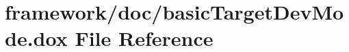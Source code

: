 \hypertarget{basic_target_dev_mode_8dox}{}\section{framework/doc/basic\+Target\+Dev\+Mode.dox File Reference}
\label{basic_target_dev_mode_8dox}
